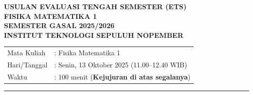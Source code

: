 \documentclass[11pt,a4paper]{article}
\begin{document}
\begin{center}
    {\large\bfseries USULAN EVALUASI TENGAH SEMESTER (ETS)\\
    FISIKA MATEMATIKA 1}\\
    {\bfseries SEMESTER GASAL 2025/2026}\\
    {\bfseries INSTITUT TEKNOLOGI SEPULUH NOPEMBER}
\end{center}
\begin{tabular}{@{}ll@{}}
    Mata Kuliah  & : Fisika Matematika 1 \\
    Hari/Tanggal & : Senin, 13 Oktober 2025 (11.00--12.40 WIB) \\
    Waktu        & : 100 menit (\textbf{Kejujuran di atas segalanya})
\end{tabular}

\smallskip
\hrule
\medskip
\end{document}
